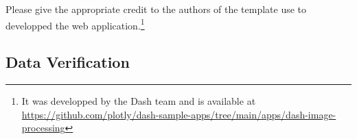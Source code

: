\documentclass[11pt]{article}
\begin{document}
            Please give the appropriate credit to the authors of the template use to developped the web application.\footnote{It was developped by the Dash team and is available
            at \url{https://github.com/plotly/dash-sample-apps/tree/main/apps/dash-image-processing}}


        \subsection{Data Verification}
    \newpage
    {
    \small

    \printbibliography
    }
\end{document}
